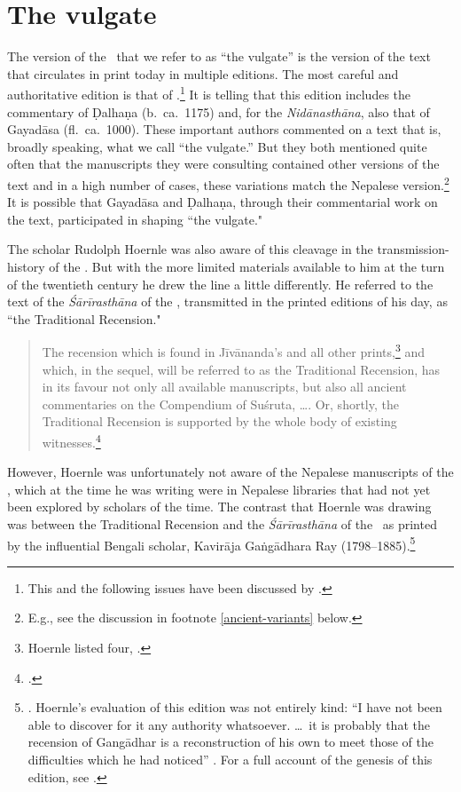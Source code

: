 \section{The vulgate}

The version of the \SS\ that we refer to as “the vulgate” is the
version of the text that circulates in print today in multiple
editions.  The most careful and authoritative edition is that of
\citet{vulgate}.\footnote{This and the following issues have been
    discussed by \citet[2 and ch.\,3]{wuja-2023}.}  It is telling that
    this edition includes the commentary of Ḍalhaṇa (b.\ ca.\ 1175) and,
    for the \emph{Nidānasthāna}, also that of Gayadāsa (fl.\ ca.\ 1000).
    These important authors commented on a text that is, broadly speaking,
    what we call “the vulgate.”  But they both mentioned quite often that
    the manuscripts they were consulting contained other versions of the
    text and in a high number of cases, these variations match the
    Nepalese version.\footnote{E.g., see the discussion in footnote
        \ref{ancient-variants} below.}  It is possible that Gayadāsa  and Ḍalhaṇa,
        through their commentarial work on the text, participated in shaping
        “the vulgate."

The scholar Rudolph Hoernle was also aware of this cleavage in the
transmission-history of the \SS.  But with the more limited materials
available to him at the turn of the twentieth century he drew the line
a little differently.  He referred to the text of the
\emph{Śārīrasthāna} of the \SS, transmitted in the printed editions of his day, as
“the Traditional Recension."
\begin{quote}
    The recension which is found in Jīvānanda's and all other
prints,\footnote{Hoernle listed four,
    \cites{bhat-1889,gupt-1835,govi-1901,vira-nd}.} and which, in the
    sequel, will be referred to as the Traditional Recension, has in
    its favour not only all available manuscripts, but also all
    ancient commentaries on the Compendium of Suśruta, \ldots.  Or,
    shortly, the Traditional Recension is supported by the whole body
    of existing witnesses.\footcite[68]{hoer-1907}
\end{quote}
However, Hoernle was unfortunately not aware of the Nepalese
manuscripts of the \SS, which at the time he was writing were in
Nepalese libraries that had not yet been explored by scholars of the
time.  The contrast that Hoernle was drawing was between the
Traditional Recension and the \emph{Śārīrasthāna} of the \CS\ as
printed by the influential Bengali scholar, Kavirāja Gaṅgādhara Ray
(1798--1885).\footnote{\cite{gang-1868}.  Hoernle's evaluation of this
    edition was not entirely kind: “I have not been able to discover for
    it any authority whatsoever. \ldots\ it is probably that the recension
    of Gangādhar is a reconstruction of his own to meet those of the
    difficulties which he had noticed” \citep[70]{hoer-1907}.  For a full
    account of the genesis of this edition, see \cite{pecc-2022}.}

